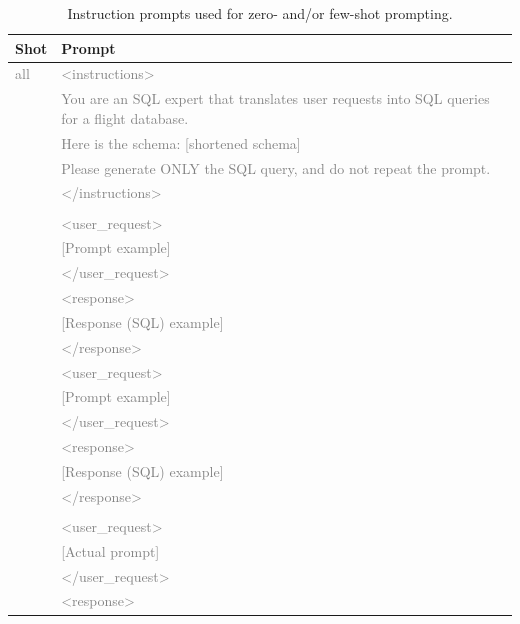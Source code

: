 \documentclass{article}
\begin{document}
\begin{table}[h!]
\centering
\begin{tabular}{p{1cm}p{12cm}}
\toprule
\textbf{Shot} & \textbf{Prompt} \\
\midrule
     \textcolor{gray}{all} & \textcolor{gray}{\textless instructions\textgreater } \\
    & \textcolor{gray}{You are an SQL expert that translates user requests into SQL queries for a flight database.} \\
    & \textcolor{gray}{Here is the schema: [shortened schema]} \\
    & \textcolor{gray}{Please generate ONLY the SQL query, and do not repeat the prompt.} \\
    & \textcolor{gray}{\textless /instructions\textgreater } \\
    & \\
    & \textcolor{gray}{\textless user\_request\textgreater} \\
    & \textcolor{gray}{[Prompt example]} \\
    & \textcolor{gray}{\textless /user\_request\textgreater} \\
    & \textcolor{gray}{\textless response\textgreater} \\
    & \textcolor{gray}{[Response (SQL) example]} \\
    & \textcolor{gray}{\textless /response\textgreater} \\
    & \textcolor{gray}{\textless user\_request\textgreater} \\
    & \textcolor{gray}{[Prompt example]} \\
    & \textcolor{gray}{\textless /user\_request\textgreater} \\
    & \textcolor{gray}{\textless response\textgreater} \\
    & \textcolor{gray}{[Response (SQL) example]} \\
    & \textcolor{gray}{\textless /response\textgreater} \\
    & \\
    & \textcolor{gray}{\textless user\_request\textgreater} \\
    & \textcolor{gray}{[Actual prompt]} \\
    & \textcolor{gray}{\textless /user\_request\textgreater} \\
    & \textcolor{gray}{\textless response\textgreater} \\
\bottomrule
\end{tabular}
\caption{Instruction prompts used for zero- and/or few-shot prompting.}
\label{tab:icl_prompts}
\end{table}
\end{document}
